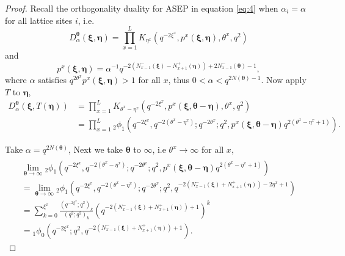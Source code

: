 \documentclass{ximera}
\begin{document}
\begin{proof}
Recall the orthogonality duality for ASEP in equation \eqref{eq:4} when $\alpha_i = \alpha$ for all lattice sites $i$, i.e. 
\begin{equation*}
    D_\alpha^{\boldsymbol\theta}(\boldsymbol\xi,\boldsymbol\eta)=\prod_{x=1}^L K_{\eta^x}\left(q^{-2\xi^x}, p^x(\boldsymbol\xi,\boldsymbol\eta),\theta^x,q^2\right)
\end{equation*}
and
\begin{equation*}
p^x(\boldsymbol\xi,\boldsymbol\eta)=\alpha^{-1}q^{-2\left(N_{x-1}^-(\boldsymbol\xi)-N_{x+1}^+(\boldsymbol\eta)\right)+2N_{x-1}^-(\boldsymbol\theta)-1},
\end{equation*}
where $\alpha$ satisfies $q^{2\theta^x}p^x(\boldsymbol\xi,\boldsymbol\eta)>1$ for all $x$, thus $0<\alpha<q^{2N(\boldsymbol\theta)-1}$.
\newline
Now apply $T$ to $\boldsymbol\eta$, 
\begin{equation}
\begin{array}{cl}
D_\alpha^{\boldsymbol\theta}\left(\boldsymbol\xi,T(\boldsymbol\eta)\right)  &  =\prod_{x=1}^L K_{\theta^x-\eta^x}\left(q^{-2\xi^x}, p^x(\boldsymbol\xi,\boldsymbol\theta-\boldsymbol\eta),\theta^x,q^2\right) \\
     &  =\prod_{x=1}^L {}_2\phi_1(q^{-2\xi^x},q^{-2(\theta^x-\eta^x)};q^{-2\theta^x};q^2,p^x(\boldsymbol\xi,\boldsymbol\theta-\boldsymbol\eta)q^{2(\theta^x-\eta^x+1)}).
\end{array}
\end{equation}

Take $\alpha=q^{2N(\boldsymbol\theta)}$,
Next we take $\boldsymbol\theta$ to $\infty$, i.e $\theta^x\xrightarrow[]{}\infty$ for all $x$,
\begin{equation}
\begin{array}{l}
 \displaystyle{\lim_{\boldsymbol\theta\xrightarrow{}\infty}{}_2\phi_1(q^{-2\xi^x},q^{-2(\theta^x-\eta^x)};q^{-2\theta^x};q^2,p^x(\boldsymbol\xi,\boldsymbol\theta-\boldsymbol\eta)q^{2(\theta^x-\eta^x+1)})} \\
     = \displaystyle{\lim_{\boldsymbol\theta\xrightarrow{}\infty}{}_2\phi_1\left(q^{-2\xi^x},q^{-2(\theta^x-\eta^x)};q^{-2\theta^x};q^2,q^{-2\left(N_{x-1}^-(\boldsymbol\xi)+N_{x+1}^+(\boldsymbol\eta)\right)-2\eta^x+1}\right)}\\   
       =\displaystyle{\sum_{k=0}^{\xi^x}\frac{(q^{-2\xi^x};q^2)_k}{(q^2;q^2)_k}\left(q^{-2\left(N_{x-1}^-(\boldsymbol\xi)+N_{x+1}^+(\boldsymbol\eta)\right)+1}\right)^k}\\  ={}_1\phi_0\left(q^{-2\xi^x};q^2,q^{-2\left(N_{x-1}^-(\boldsymbol\xi)+N_{x+1}^+(\boldsymbol\eta)\right)+1}\right).
\end{array}
\end{equation}
\end{proof}
\end{document}
